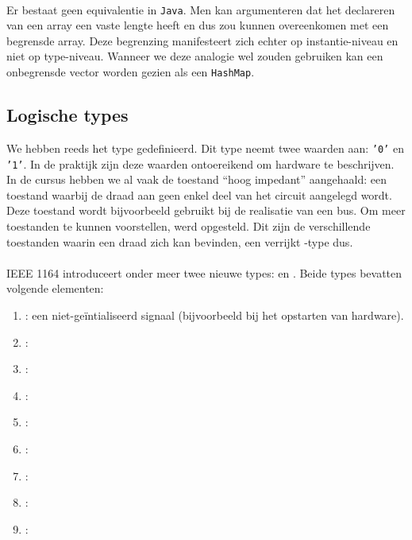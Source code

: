 
\paragraph{}
Er bestaat geen equivalentie in \texttt{Java}. Men kan argumenteren dat het declareren van een array een vaste lengte heeft en dus zou kunnen overeenkomen met een begrensde array. Deze begrenzing manifesteert zich echter op instantie-niveau en niet op type-niveau. Wanneer we deze analogie wel zouden gebruiken kan een onbegrensde vector worden gezien als een \texttt{HashMap}.

\subsection{Logische types}

We hebben reeds het type  gedefinieerd. Dit type neemt twee waarden aan: \texttt{'0'} en \texttt{'1'}. In de praktijk zijn deze waarden ontoereikend om hardware te beschrijven. In de cursus hebben we al vaak de toestand ``hoog impedant'' aangehaald: een toestand waarbij de draad aan geen enkel deel van het circuit aangelegd wordt. Deze toestand wordt bijvoorbeeld gebruikt bij de realisatie van een bus. Om meer toestanden te kunnen voorstellen, werd  opgesteld. Dit zijn de verschillende toestanden waarin een draad zich kan bevinden, een verrijkt -type dus.

\paragraph{}
IEEE 1164 introduceert onder meer twee nieuwe types:  en . Beide types bevatten volgende elementen:
\begin{enumerate}
 \item {}: een niet-ge\"intialiseerd signaal (bijvoorbeeld bij het opstarten van hardware).
 \item {}: 
 \item {}: 
 \item {}: 
 \item {}: 
 \item {}: 
 \item {}: 
 \item {}: 
 \item {}: 
\end{enumerate}

